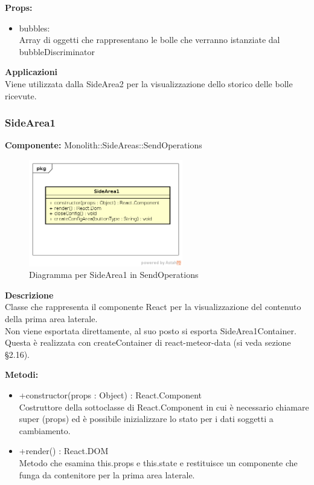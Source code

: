 \textbf{Props:} 
\begin{itemize}
\item bubbles: 
\\
Array di oggetti che rappresentano le bolle che verranno istanziate dal bubbleDiscriminator


\end{itemize} 


\textbf{Applicazioni}\\
Viene utilizzata dalla SideArea2 per la visualizzazione dello storico delle bolle ricevute. 


\clearpage

\subsubsection{SideArea1}
\textbf{Componente:}  Monolith::SideAreas::SendOperations\\
   \FloatBarrier
   \begin{figure}[ht]
   \centering
   \includegraphics[width=0.6\textwidth]{img/single-SideArea1.png}
   \caption{{Diagramma per SideArea1 in SendOperations}}
\end{figure}
\FloatBarrier
\textbf{Descrizione}\\
Classe che rappresenta il componente React per la visualizzazione del contenuto della prima area laterale. \\
Non viene esportata direttamente, al suo posto si esporta SideArea1Container. Questa è realizzata con createContainer di react-meteor-data (si veda sezione \S 2.16).
 
\textbf{Metodi:}
\begin{itemize}

\item +constructor(props : Object) : React.Component 
\\
Costruttore della sottoclasse di React.Component in cui è necessario chiamare super (props) ed è possibile inizializzare lo stato per i dati soggetti a cambiamento.

\item +render() : React.DOM 
\\
Metodo che esamina this.props e this.state e restituisce un componente che funga da contenitore per la prima area laterale.

\end{itemize}


